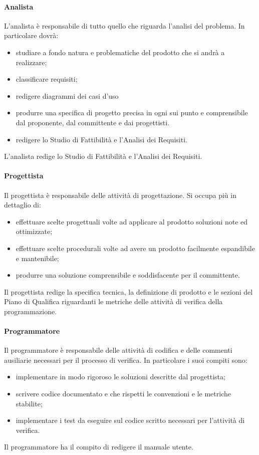\paragraph{Analista}
L'analista è responsabile di tutto quello che riguarda l'analisi del problema.
In particolare dovrà:
\begin{itemize}
	\item studiare a fondo natura e problematiche del prodotto che si andrà a realizzare;
	\item classificare requisiti;
	\item redigere diagrammi dei casi d'uso
	\item produrre una specifica di progetto precisa in ogni sui punto e comprensibile dal proponente, dal committente e dai progettisti.
	\item redigere lo Studio di Fattibilità e l'Analisi dei Requisiti.
\end{itemize}
L'analista redige lo Studio di Fattibilità e l'Analisi dei Requisiti.
\paragraph{Progettista}
Il progettista è responsabile delle attività di progettazione. Si occupa più in dettaglio di:
\begin{itemize}
	\item effettuare scelte progettuali volte ad applicare al prodotto soluzioni note ed ottimizzate;
	\item effettuare scelte procedurali volte ad avere un prodotto facilmente espandibile e mantenibile;
	\item produrre una soluzione comprensibile e soddisfacente per il committente.
\end{itemize}
Il progettista redige la specifica tecnica, la definizione di prodotto e le sezioni del Piano di Qualifica riguardanti le metriche delle attività di verifica della programmazione.
\paragraph{Programmatore}
Il programmatore è responsabile delle attività di codifica e delle commenti ausiliarie necessari per il processo di verifica.
In particolare i suoi compiti sono:
\begin{itemize}
	\item implementare in modo rigoroso le soluzioni descritte dal progettista;
	\item scrivere codice documentato e che rispetti le convenzioni e le metriche stabilite;
	\item implementare i test da eseguire sul codice scritto necessari per l'attività di verifica.
\end{itemize}
Il programmatore  ha il compito di redigere il manuale utente. 
